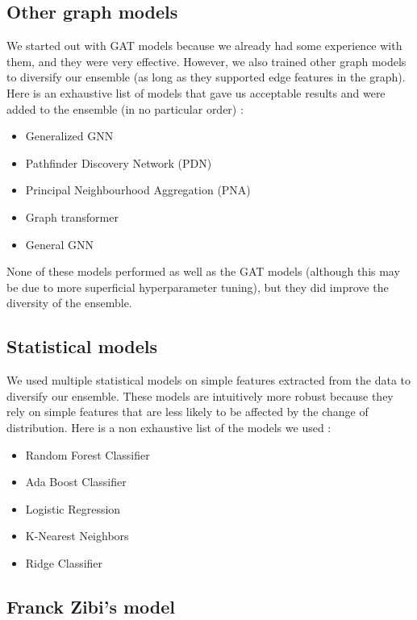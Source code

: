 \documentclass[switch, 11pt]{article}
\begin{document}
\begin{multicols}{2}
    \subsection{Other graph models}

    We started out with GAT models because we already had some experience with them, and they were very effective. However, we also trained other graph models to diversify our ensemble (as long as they supported edge features in the graph). Here is an exhaustive list of models that gave us acceptable results and were added to the ensemble (in no particular order) :
    \begin{itemize}
        \item Generalized GNN \cite{li-2020}
        \item Pathfinder Discovery Network (PDN) \cite{rozemberczki-2021}
        \item Principal Neighbourhood Aggregation (PNA) \cite{corso-2020}
        \item Graph transformer \cite{shi-2020}
        \item General GNN \cite{you-2020}
    \end{itemize}

    None of these models performed as well as the GAT models (although this may be due to more superficial hyperparameter tuning), but they did improve the diversity of the ensemble.

    \subsection{Statistical models}

    We used multiple statistical models on simple features extracted from the data to diversify our ensemble. These models are intuitively more robust because they rely on simple features that are less likely to be affected by the change of distribution. Here is a non exhaustive list of the models we used :
    \begin{itemize}
        \item Random Forest Classifier
        \item Ada Boost Classifier
        \item Logistic Regression
        \item K-Nearest Neighbors
        \item Ridge Classifier
    \end{itemize}

    \subsection{Franck Zibi's model}


\end{multicols}
\end{document}
